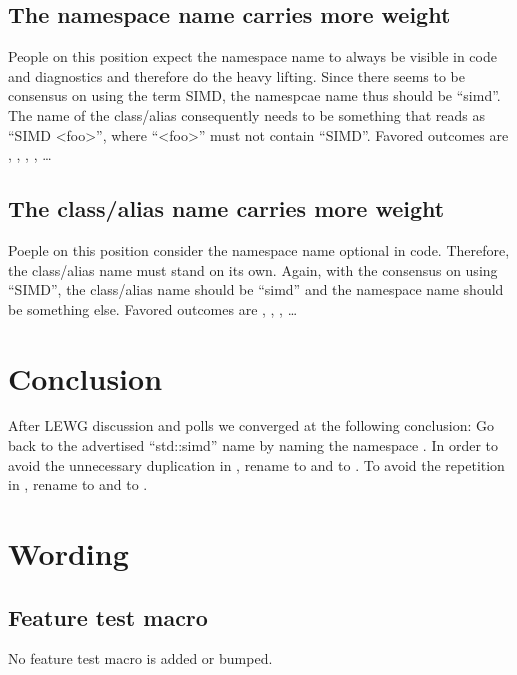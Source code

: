 \subsection{The namespace name carries more weight}
People on this position expect the namespace name to always be visible in code and diagnostics and
therefore do the heavy lifting.
Since there seems to be consensus on using the term SIMD, the namespcae name thus should be “simd”.
The name of the class/alias consequently needs to be something that reads as “SIMD <foo>”, where
“<foo>” must not contain “SIMD”.
Favored outcomes are \stdsimd{}, \stdsimd{}, \stdsimd{},
\stdsimd{}, \ldots

\subsection{The class/alias name carries more weight}
Poeple on this position consider the namespace name optional in code.
Therefore, the class/alias name must stand on its own.
Again, with the consensus on using “SIMD”, the class/alias name should be “simd” and the namespace
name should be something else.
Favored outcomes are \stddatapar{}, \std{},
\std{}, \ldots

\section{Conclusion}

After LEWG discussion and polls we converged at the following conclusion:
Go back to the advertised “std::simd” name by naming the namespace .
In order to avoid the unnecessary duplication in \stdsimd{}, rename
\stdsimd{} to \stdsimd{} and \stdsimd{} to
\stdsimd{}.
To avoid the repetition in \stdsimd{}, rename \stdsimd{} to
\stdsimd{} and \stdsimd{} to \stdsimd{}.

\section{Wording}

\subsection{Feature test macro}

No feature test macro is added or bumped.


